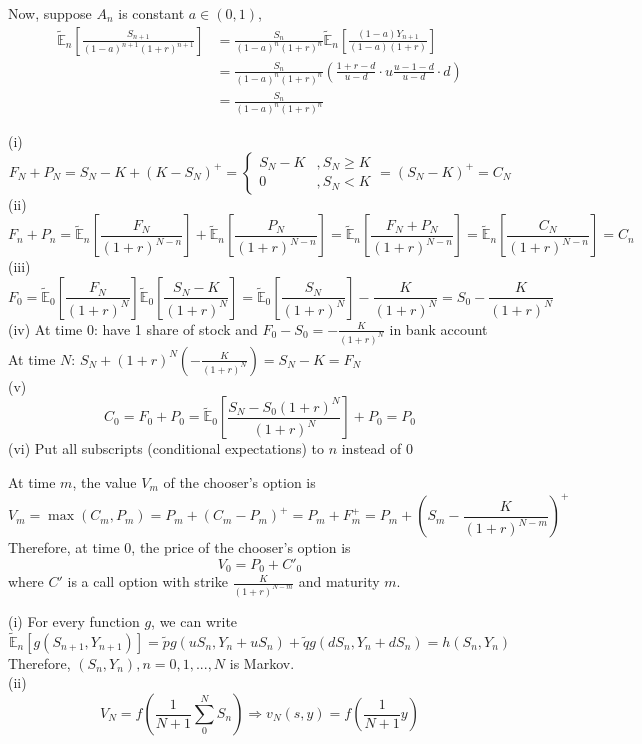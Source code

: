 \documentclass[12pt]{article}
\newenvironment{problem}[2][Problem]{\begin{trivlist}
		\item[\hskip \labelsep {\bfseries #1}\hskip \labelsep {\bfseries #2.}]}{\end{trivlist}}
\begin{document}
	Now, suppose $A_n$ is constant $a\in(0,1)$, 
	\begin{align*}
	\tilde{\mathbb{E}}_n\left[\frac{S_{n+1}}{(1-a)^{n+1}(1+r)^{n+1}}\right]&=\frac{S_n}{(1-a)^n(1+r)^n}\tilde{\mathbb{E}}_n\left[\frac{(1-a)Y_{n+1}}{(1-a)(1+r)}\right]\\
	&=\frac{S_n}{(1-a)^n(1+r)^n} \left(\frac{1+r-d}{u-d}\cdot u \frac{u-1-d}{u-d}\cdot d\right) \\ &=\frac{S_n}{(1-a)^n(1+r)^n}
	\end{align*}
	\begin{problem}{11}	\end{problem}
	(i) $$ F_N+P_N = S_N-K + (K-S_N)^+ = \begin{cases} S_N-K &,S_N\ge K\\0&, S_N<K\end{cases} = (S_N-K)^+=C_N$$
	(ii) $$F_n+P_n = \tilde{\mathbb{E}}_n\left[\frac{F_N}{(1+r)^{N-n}}\right]+\tilde{\mathbb{E}}_n\left[\frac{P_N}{(1+r)^{N-n}}\right]=\tilde{\mathbb{E}}_n\left[\frac{F_N+P_N}{(1+r)^{N-n}}\right]=\tilde{\mathbb{E}}_n\left[\frac{C_N}{(1+r)^{N-n}}\right]=C_n$$
	(iii)
	$$F_0 = \tilde{\mathbb{E}}_0\left[\frac{F_N}{(1+r)^{N}}\right]\tilde{\mathbb{E}}_0\left[\frac{S_N-K}{(1+r)^{N}}\right]=\tilde{\mathbb{E}}_0\left[\frac{S_N}{(1+r)^{N}}\right]-\frac{K}{(1+r)^{N}}=S_0-\frac{K}{(1+r)^{N}}$$
	(iv) At time 0: have 1 share of stock and $F_0-S_0=-\frac{K}{(1+r)^N}$ in bank account\\
	At time $N$: $S_N+(1+r)^N\left(-\frac{K}{(1+r)^N}\right)=S_N-K=F_N$\\
	(v) $$C_0 =F_0+P_0 = \tilde{\mathbb{E}}_0\left[\frac{S_N-S_0(1+r)^N}{(1+r)^{N}}\right]+P_0=P_0$$
	(vi) Put all subscripts (conditional expectations) to $n$ instead of $0$
	\begin{problem}{12}\end{problem}
	At time $m$, the value $V_m$ of the chooser's option is 
	$$V_m = \max(C_m,P_m) = P_m+(C_m-P_m)^+ =P_m+F_m^+ = P_m+\left(S_m-\frac{K}{(1+r)^{N-m}}\right)^+$$
	Therefore, at time 0, the price of the chooser's option is 
	$$V_0 = P_0+C'_0$$ where $C'$ is a call option with strike $\frac{K}{(1+r)^{N-m}}$ and maturity $m$. 
	\begin{problem}{13}\end{problem}
	(i) For every function $g$, we can write
	$$\tilde{\mathbb{E}}_n[g(S_{n+1},Y_{n+1})]=\tilde{p}g(uS_n,Y_n+uS_n)+\tilde{q}g(dS_n,Y_n+dS_n)=h(S_n,Y_n)$$
	Therefore, $(S_n,Y_n), n=0,1,...,N$ is Markov.\\
	(ii) $$V_N = f\left(\frac{1}{N+1}\sum_0^N S_n \right) \Rightarrow v_N(s,y) = f\left(\frac{1}{N+1}y\right)$$
\end{document}
